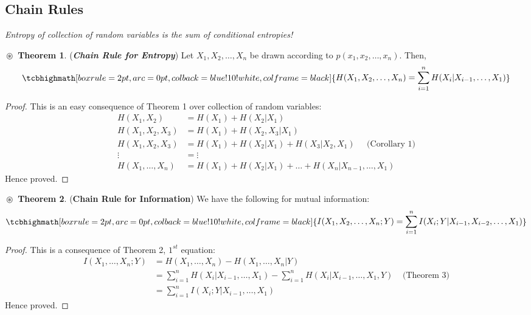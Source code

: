 \documentclass{article}
\theoremstyle{definition}
\newtheorem{theorem}{$\boxed{\boxed{\circledast}}$ Theorem}
\theoremstyle{remark}
\theoremstyle{definition}
\theoremstyle{definition}
\theoremstyle{definition}
\newcommand{\given}{\vert}
\newcommand{\theoreq}[1]{
		\tcbhighmath[boxrule=2pt,arc=0pt,colback=blue!10!white,colframe=black]{\begin{aligned}
				#1
		\end{aligned}}}
\begin{document}
\subsection{Chain Rules}
\emph{Entropy of collection of random variables is the sum of conditional entropies!}
\begin{theorem}
	\label{T3}
	(\textbf{\textit{Chain Rule for Entropy}})  Let $ X_1,X_2,\dots,X_n $ be drawn according to $ p(x_1,x_2,\dots, x_n) $. Then,
\begin{equation}
	\theoreq{H(X_1,X_2,\dots,X_n) = \sum_{i=1}^n H(X_i \given X_{i-1},\dots,X_1)}
\end{equation}
\end{theorem}
	\begin{proof}
		This is an easy consequence of Theorem 1 over collection of random variables:
		\begin{equation*}
			\begin{split}
				H(X_1,X_2) &= H(X_1) + H(X_2\given X_1)\\
				H(X_1,X_2,X_3) &= H(X_1) + H(X_2,X_3\given X_1)\\
				H(X_1,X_2,X_3) &= H(X_1) + H(X_2\given X_1) + H(X_3\given X_2, X_1) \;\;\;\;\;\text{(Corollary 1)}\\
				\vdots &= \vdots\\
				H(X_1,\dots,X_n) &= H(X_1) + H(X_2\given X_1) + \dots + H(X_n \given X_{n-1},\dots, X_1)
			\end{split}
		\end{equation*}
	Hence proved.
	\end{proof}
\hrulefill
\begin{theorem}
	\label{T4}
	(\textbf{Chain Rule for Information}) We have the following for mutual information:
	\begin{equation}
		\theoreq{I(X_1,X_2,\dots,X_n; Y) = \sum_{i=1}^n I(X_i ; Y\given X_{i-1}, X_{i-2},\dots, X_1)}
	\end{equation}
\end{theorem}
\begin{proof}
	This is a consequence of Theorem 2, $ 1^{st} $ equation:
	\begin{equation*}
		\begin{split}
			I(X_1,\dots,X_n; Y) &= H(X_1,\dots,X_n) - H(X_1,\dots,X_n \given Y)\\
			&=  \sum_{i=1}^n H(X_i \given X_{i-1},\dots,X_1) -  \sum_{i=1}^n H(X_i \given X_{i-1},\dots,X_1,Y)\;\;\;\;\text{(Theorem 3)}\\
			&= \sum_{i=1}^n I(X_i ; Y \given X_{i-1},\dots,X_1)
		\end{split}
	\end{equation*}
Hence proved.
\end{proof}
\end{document}
